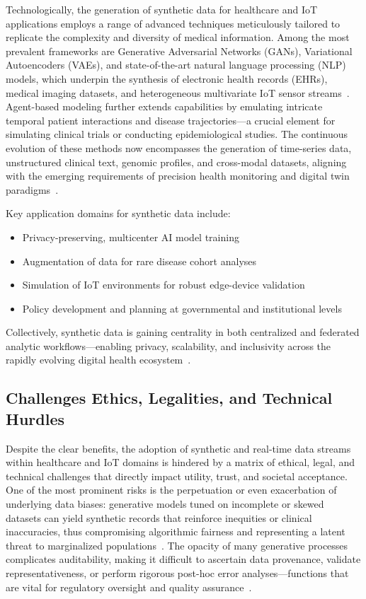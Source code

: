 \documentclass[sigconf]{acmart}
\begin{document}
Technologically, the generation of synthetic data for healthcare and IoT applications employs a range of advanced techniques meticulously tailored to replicate the complexity and diversity of medical information. Among the most prevalent frameworks are Generative Adversarial Networks (GANs), Variational Autoencoders (VAEs), and state-of-the-art natural language processing (NLP) models, which underpin the synthesis of electronic health records (EHRs), medical imaging datasets, and heterogeneous multivariate IoT sensor streams~\cite{ref91}. Agent-based modeling further extends capabilities by emulating intricate temporal patient interactions and disease trajectories—a crucial element for simulating clinical trials or conducting epidemiological studies. The continuous evolution of these methods now encompasses the generation of time-series data, unstructured clinical text, genomic profiles, and cross-modal datasets, aligning with the emerging requirements of precision health monitoring and digital twin paradigms~\cite{ref91,ref106}.

Key application domains for synthetic data include:

\begin{itemize}
    \item Privacy-preserving, multicenter AI model training
    \item Augmentation of data for rare disease cohort analyses
    \item Simulation of IoT environments for robust edge-device validation
    \item Policy development and planning at governmental and institutional levels
\end{itemize}

Collectively, synthetic data is gaining centrality in both centralized and federated analytic workflows—enabling privacy, scalability, and inclusivity across the rapidly evolving digital health ecosystem~\cite{ref91,ref106}.

\subsection{Challenges Ethics, Legalities, and Technical Hurdles}

Despite the clear benefits, the adoption of synthetic and real-time data streams within healthcare and IoT domains is hindered by a matrix of ethical, legal, and technical challenges that directly impact utility, trust, and societal acceptance. One of the most prominent risks is the perpetuation or even exacerbation of underlying data biases: generative models tuned on incomplete or skewed datasets can yield synthetic records that reinforce inequities or clinical inaccuracies, thus compromising algorithmic fairness and representing a latent threat to marginalized populations~\cite{ref91}. The opacity of many generative processes complicates auditability, making it difficult to ascertain data provenance, validate representativeness, or perform rigorous post-hoc error analyses—functions that are vital for regulatory oversight and quality assurance~\cite{ref106}.
\end{document}
